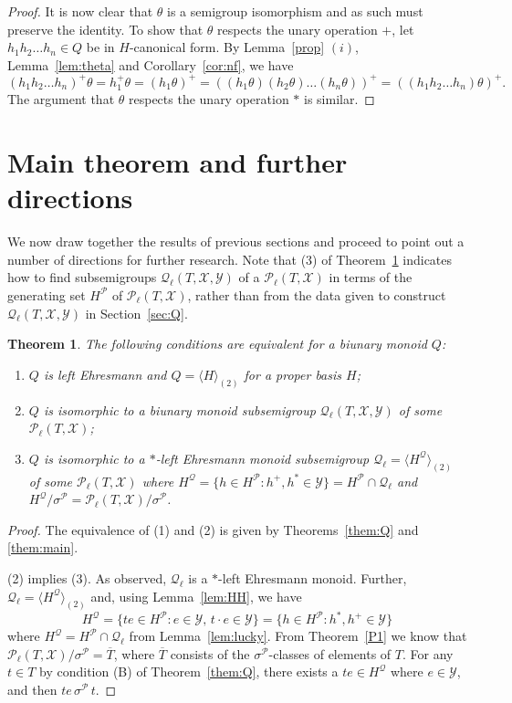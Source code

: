 \documentclass[12pt]{amsart}
\newtheorem{them}{Theorem}[section]
\theoremstyle{definition}
\theoremstyle{definition}
\numberwithin{them}{section}
\numberwithin{equation}{section}
\newcommand{\QQ}{\mbox{$\mathcal{Q}_\ell$}}
\newcommand{\X}{\mathcal{X}}
\newcommand{\Y}{\mathcal{Y}}
\begin{document}
{{\begin{proof}
It is now clear that $\theta$ is a semigroup isomorphism and as such  must preserve the identity. To show that $\theta$ respects the unary operation $+$, let $h_1h_2\dots h_n\in Q$ be in $H$-canonical form. By Lemma~\ref{prop} $(i)$, Lemma~\ref{lem:theta} and Corollary~\ref{cor:nf}, we have
\[
(h_1h_2\dots h_n)^+\theta= h_1^+\theta=(h_1\theta)^+=((h_1\theta)( h_2\theta) \dots (h_n\theta))^+= ((h_1h_2\dots h_n)\theta)^+.
\]
The argument that  $\theta$ respects the unary operation $*$ is similar.
\end{proof}




\section{Main theorem and further directions}\label{sec:main}

 We now  draw together the results of previous sections and proceed to point out a number of directions for further research. Note that (3) of Theorem~\ref{them:conclusion}  indicates how to find subsemigroups $\QQ(T,\X,\Y)$ of a $\mathcal{P}_{\ell}(T,\X)$ in terms of the  generating set $H^{\mathcal{P}}$ of  $\mathcal{P}_{\ell}(T,\X)$, rather than from the data given to construct $\QQ(T,\X,\Y)$ in Section~\ref{sec:Q}.

\begin{them}\label{them:conclusion} The following conditions are equivalent for a biunary monoid $Q$:
\begin{enumerate}
\item  $Q$
is  left Ehresmann  and $Q=\langle H\rangle_{(2)}$ for a proper basis $H$;
\item  $Q$ is isomorphic to a biunary monoid subsemigroup $\QQ(T,\X,\Y)$ of some $\mathcal{P}_{\ell}(T,\X)$;
\item $Q$ is isomorphic to a $*$-left Ehresmann monoid subsemigroup $\QQ=\langle H^{\mathcal{Q}}\rangle_{(2)}$ of some $\mathcal{P}_{\ell}(T,\X)$
where $H^{\mathcal{Q}}=\{ h\in H^{\mathcal{P}}: h^+,h^*\in \Y\}=H^{\mathcal{P}}\cap \QQ$ and $H^{\mathcal{Q}}/\sigma^{\mathcal{P}}=\mathcal{P}_{\ell}(T,\X)/\sigma^{\mathcal{P}}$.
\end{enumerate}
\end{them}
\begin{proof} The equivalence of (1) and (2) is given by  Theorems~\ref{them:Q} and \ref{them:main}.

(2) implies (3). As observed,  $\QQ$  is a $*$-left Ehresmann monoid.   Further,   $\QQ=\langle H^{\mathcal{Q}}\rangle_{(2)}$ and, using Lemma~\ref{lem:HH}, we have
 \[H^{\mathcal{Q}}= \{ te\in H^{\mathcal{P}}: e\in\Y, \, t\cdot e\in \Y\}=\{ h\in H^{\mathcal{P}}: h^*, h^+ \in\Y\}\] 
where $H^{\mathcal{Q}}= H^{\mathcal{P}}\cap \QQ$ from Lemma~\ref{lem:lucky}.
 From Theorem~\ref{P1} we know that $\mathcal{P}_{\ell}(T,\X)/\sigma^{\mathcal{P}}=\overline{T}$,  where $\overline{T}$ consists of the $\sigma^{\mathcal{P}}$-classes of elements of $T$. For any $t\in T$ by condition (B) of Theorem~\ref{them:Q}, there exists a $te\in H^{\mathcal{Q}}$ where $e\in \Y$, and then
$te\,\sigma^{\mathcal{P}}\, t$.


\end{proof}}}
\end{document}
